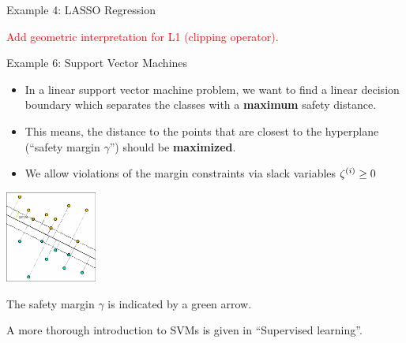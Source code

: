 \begin{vbframe}{Example 4: LASSO Regression}

\textcolor{red}{Add geometric interpretation for L1 (clipping operator). }

\end{vbframe}

	\begin{frame}{Example 6: Support Vector Machines} 
		
		\begin{itemize}
			\item In a linear support vector machine problem, we want to find a linear decision boundary which separates the classes with a \textbf{maximum} safety distance. 
			\item This means, the distance to the points that are closest to the hyperplane (\enquote{safety margin $\gamma$}) should be \textbf{maximized}. 
			\item We allow violations of the margin constraints via slack variables $\zeta^{(i)} \geq 0$
		\end{itemize}
		
		\vspace*{-0.3cm}
		
		\begin{center}
			\includegraphics[width=3cm]{figure_man/svm_example.pdf} \\
			\begin{footnotesize}
				The safety margin $\gamma$ is indicated by a green arrow. 
			\end{footnotesize}
		\end{center}
	
	\begin{footnotesize}
		A more thorough introduction to SVMs is given in ``Supervised learning''. 
	\end{footnotesize}
	\end{frame}	
%		
%		
%		

